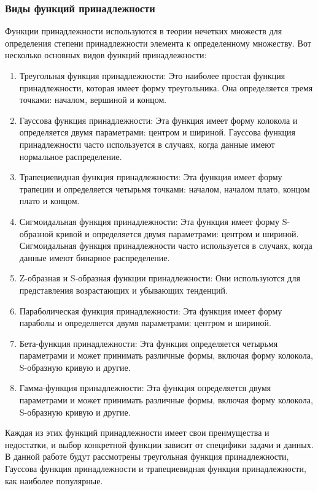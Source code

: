 \documentclass{article}
\begin{document}
    \subsubsection{Виды функций принадлежности}
    Функции принадлежности используются в теории нечетких множеств для определения степени принадлежности элемента к определенному множеству. Вот несколько основных видов функций принадлежности:
    \begin{enumerate}
        \item Треугольная функция принадлежности: Это наиболее простая функция принадлежности, которая имеет форму треугольника. Она определяется тремя точками: началом, вершиной и концом.
        \item Гауссова функция принадлежности: Эта функция имеет форму колокола и определяется двумя параметрами: центром и шириной. Гауссова функция принадлежности часто используется в случаях, когда данные имеют нормальное распределение.
        \item Трапециевидная функция принадлежности: Эта функция имеет форму трапеции и определяется четырьмя точками: началом, началом плато, концом плато и концом.
        \item Сигмоидальная функция принадлежности: Эта функция имеет форму S-образной кривой и определяется двумя параметрами: центром и шириной. Сигмоидальная функция принадлежности часто используется в случаях, когда данные имеют бинарное распределение.
        \item Z-образная и S-образная функции принадлежности: Они используются для представления возрастающих и убывающих тенденций.
        \item Параболическая функция принадлежности: Эта функция имеет форму параболы и определяется двумя параметрами: центром и шириной.
        \item Бета-функция принадлежности: Эта функция определяется четырьмя параметрами и может принимать различные формы, включая форму колокола, S-образную кривую и другие.
        \item Гамма-функция принадлежности: Эта функция определяется двумя параметрами и может принимать различные формы, включая форму колокола, S-образную кривую и другие.
    \end{enumerate}
    Каждая из этих функций принадлежности имеет свои преимущества и недостатки, и выбор конкретной функции зависит от специфики задачи и данных. В данной работе будут рассмотрены треугольная функция принадлежности, Гауссова функция принадлежности и трапециевидная функция принадлежности, как наиболее популярные.
\end{document}
